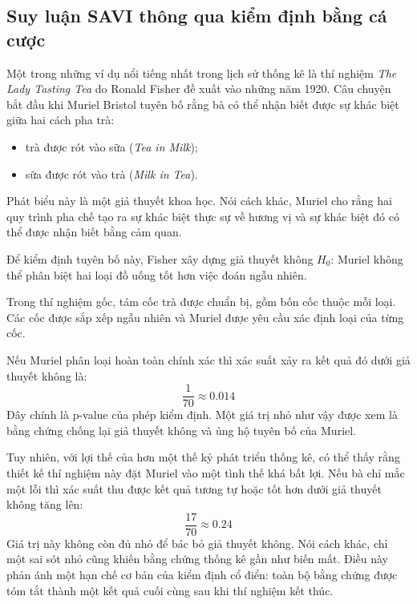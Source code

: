 \subsection{Suy luận SAVI thông qua kiểm định bằng cá cược}

Một trong những ví dụ nổi tiếng nhất trong lịch sử thống kê là thí nghiệm \textit{The Lady Tasting Tea} do Ronald Fisher đề xuất vào những năm 1920. Câu chuyện bắt đầu khi Muriel Bristol tuyên bố rằng bà có thể nhận biết được sự khác biệt giữa hai cách pha trà:

\begin{itemize}
    \item trà được rót vào sữa (\textit{Tea in Milk});
    \item sữa được rót vào trà (\textit{Milk in Tea}).
\end{itemize}

Phát biểu này là một giả thuyết khoa học. Nói cách khác, Muriel cho rằng hai quy trình pha chế tạo ra sự khác biệt thực sự về hương vị và sự khác biệt đó có thể được nhận biết bằng cảm quan.

Để kiểm định tuyên bố này, Fisher xây dựng giả thuyết không $H_0$: Muriel không thể phân biệt hai loại đồ uống tốt hơn việc đoán ngẫu nhiên.

Trong thí nghiệm gốc, tám cốc trà được chuẩn bị, gồm bốn cốc thuộc mỗi loại. Các cốc được sắp xếp ngẫu nhiên và Muriel được yêu cầu xác định loại của từng cốc.

Nếu Muriel phân loại hoàn toàn chính xác thì xác suất xảy ra kết quả đó dưới giả thuyết không là:
\begin{equation}
    \frac{1}{70} \approx 0.014
\end{equation}
Đây chính là p-value của phép kiểm định. Một giá trị nhỏ như vậy được xem là bằng chứng chống lại giả thuyết không và ủng hộ tuyên bố của Muriel.

Tuy nhiên, với lợi thế của hơn một thế kỷ phát triển thống kê, có thể thấy rằng thiết kế thí nghiệm này đặt Muriel vào một tình thế khá bất lợi. Nếu bà chỉ mắc một lỗi thì xác suất thu được kết quả tương tự hoặc tốt hơn dưới giả thuyết không tăng lên:
\begin{equation}
    \frac{17}{70} \approx 0.24
\end{equation}
Giá trị này không còn đủ nhỏ để bác bỏ giả thuyết không. Nói cách khác, chỉ một sai sót nhỏ cũng khiến bằng chứng thống kê gần như biến mất. Điều này phản ánh một hạn chế cơ bản của kiểm định cổ điển: toàn bộ bằng chứng được tóm tắt thành một kết quả cuối cùng sau khi thí nghiệm kết thúc.

